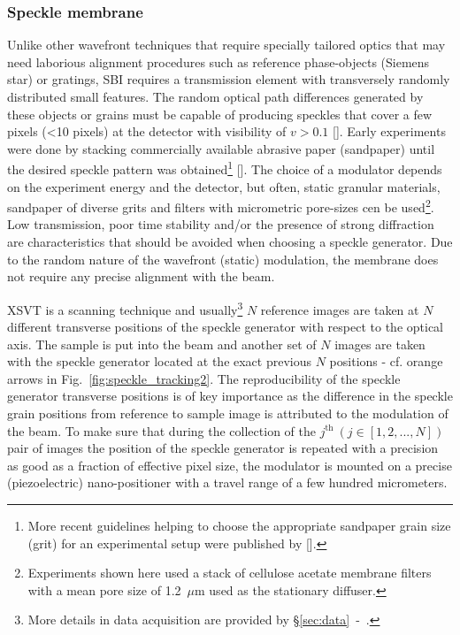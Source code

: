 \begin{refsection}
\subsubsection*{Speckle membrane}

Unlike other wavefront techniques that require specially tailored optics that may need laborious alignment procedures such as reference phase-objects (Siemens star) or gratings, SBI requires a transmission element with transversely randomly distributed small features. The random optical path differences generated by these objects or grains must be capable of producing speckles that cover a few pixels (<10 pixels) at the detector with visibility of $ v>0.1$ [\cite[\textit{\S2.3}]{Berujon2020a}]. Early experiments were done by stacking commercially available abrasive paper (sandpaper) until the desired speckle pattern was obtained\footnote{More recent guidelines helping to choose the appropriate sandpaper grain size (grit) for an experimental setup were published by [\cite{Tian2020}].} [\cite{Morgan2012, Wang2016}]. The choice of a modulator depends on the experiment energy and the detector, but often, static granular materials, sandpaper of diverse grits and filters with micrometric pore-sizes cen be used\footnote{Experiments shown here used a stack of cellulose acetate membrane filters with a mean pore size of 1.2~$\mu$m used as the stationary diffuser.}. Low transmission, poor time stability and/or the presence of strong diffraction are characteristics that should be avoided when choosing a speckle generator. Due to the random nature of the wavefront (static) modulation, the membrane does not require any precise alignment with  the beam. 

XSVT is a scanning technique and usually\footnote{More details in data acquisition are provided by \S\ref{sec:data}~-~\textit{}.} $N$ reference images are taken at $N$ different transverse positions of the speckle generator with respect to the optical axis. The sample is put into the beam and another set of $N$ images are taken with the speckle generator located at the exact previous $N$ positions - cf. orange arrows in Fig.~\ref{fig:speckle_tracking2}. The reproducibility of the speckle generator transverse positions is of key importance as the difference in the speckle grain positions from reference to sample image is attributed to the modulation of the beam. To make sure that during the collection of the $j^\text{th}~(j\in[1,2,...,N])$ pair of images the position of the speckle generator is repeated with a precision as good as a fraction of effective pixel size, the modulator is mounted on a precise (piezoelectric) nano-positioner with a travel range of a few hundred micrometers.


\end{refsection}
